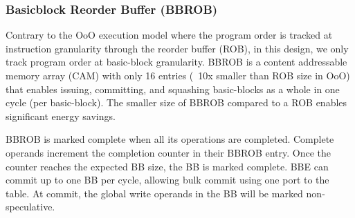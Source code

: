 \subsubsection{Basicblock Reorder Buffer (BBROB)}
\label{sec:bb_rob}

Contrary to the OoO execution model where the program order is tracked at
instruction granularity through the reorder buffer (ROB), in this design, we only
track program order at basic-block granularity. BBROB is a content addressable
memory array (CAM) with only 16 entries (~10x smaller than ROB size in OoO) that
enables issuing, committing, and squashing basic-blocks as a whole in one cycle
(per basic-block). The smaller size of BBROB compared to a ROB enables
significant energy savings.

BBROB is marked complete when all its operations are completed. Complete
operands increment the completion counter in their BBROB entry. Once the counter
reaches the expected BB size, the BB is marked complete. BBE can commit up to
one BB per cycle, allowing bulk commit using one port to the table. At commit,
    the global write operands in the BB will be marked non-speculative.



